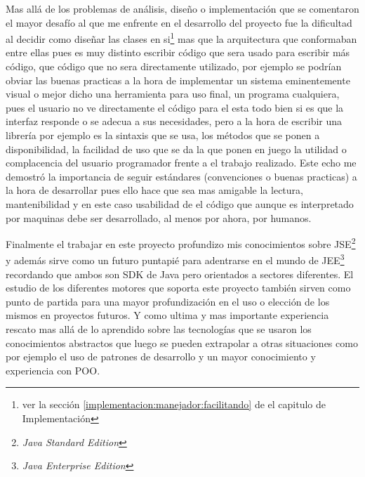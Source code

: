 Mas allá de los problemas de análisis, diseño o implementación que se comentaron
el mayor desafío al que me  enfrente en el desarrollo del proyecto fue la dificultad al decidir como diseñar las clases en si\footnote{ver la sección \ref{implementacion:manejador:facilitando} de el capitulo de Implementación} mas que la arquitectura que conformaban entre ellas pues es muy distinto escribir código que sera usado para escribir más código, que código que no sera directamente utilizado, por ejemplo se podrían obviar las buenas practicas a la hora de implementar un sistema eminentemente visual o mejor dicho una herramienta para uso final, un programa cualquiera, pues el usuario no ve directamente el código para el esta todo bien si es que la interfaz responde o se adecua a sus necesidades, pero a la hora de escribir una librería por ejemplo es la sintaxis que se usa, los métodos que se ponen a disponibilidad, la facilidad de uso que se da la que ponen en juego la utilidad o complacencia del usuario programador frente a el trabajo realizado. Este echo me demostró la importancia de seguir estándares (convenciones o buenas practicas) a la hora de desarrollar pues ello hace que sea mas amigable la lectura, mantenibilidad y en este caso usabilidad de el código que aunque es interpretado por maquinas debe ser desarrollado, al menos por ahora, por humanos.

Finalmente el trabajar en este proyecto profundizo mis conocimientos sobre JSE\footnote{\textit{Java Standard Edition}} y además sirve como un futuro puntapié para adentrarse en el mundo de JEE\footnote{\textit{Java Enterprise Edition}} recordando que ambos son SDK de Java pero orientados a sectores diferentes. El estudio de los diferentes motores que soporta este proyecto también sirven como punto de partida para una mayor profundización en el uso o elección de los mismos en proyectos futuros. Y como ultima y mas importante experiencia rescato mas allá de lo aprendido sobre las tecnologías que se usaron los conocimientos abstractos que luego se pueden extrapolar a otras situaciones como por ejemplo el uso de patrones de desarrollo y un mayor conocimiento y experiencia con POO.